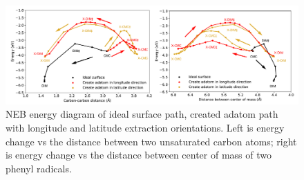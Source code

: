 \documentclass[%
 reprint,
 amsmath,amssymb,
 aps,
prb,
floatfix,
]{revtex4-2}
\begin{document}
\begin{figure}[hbt]
\centering
\includegraphics[width=1.0\textwidth]{Fig/distance-energy.pdf}
\caption{NEB energy diagram of ideal surface path, created adatom path with longitude and latitude extraction orientations. Left is energy change vs the distance between two unsaturated carbon atoms; right is energy change vs the distance between center of mass of two phenyl radicals.}
\label{fig:distance-energy}
\end{figure}
\end{document}
